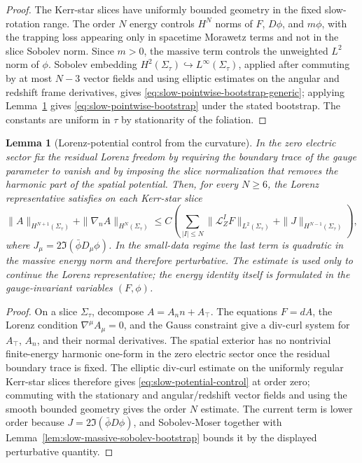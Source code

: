 \documentclass[11pt]{article}
\numberwithin{equation}{section}
\theoremstyle{plain}
\newtheorem{lemma}[theorem]{Lemma}
\theoremstyle{definition}
\theoremstyle{remark}
\begin{document}
\begin{proof}
The Kerr-star slices have uniformly bounded geometry in the fixed slow-rotation range.  The order \(N\) energy controls \(H^N\) norms of \(F\), \(D\phi\), and \(m\phi\), with the trapping loss appearing only in spacetime Morawetz terms and not in the slice Sobolev norm.  Since \(m>0\), the massive term controls the unweighted \(L^2\) norm of \(\phi\).  Sobolev embedding \(H^2(\Sigma_\tau)\hookrightarrow L^\infty(\Sigma_\tau)\), applied after commuting by at most \(N-3\) vector fields and using elliptic estimates on the angular and redshift frame derivatives, gives \eqref{eq:slow-pointwise-bootstrap-generic}; applying Lemma~\ref{lem:slow-lorenz-potential-control} gives \eqref{eq:slow-pointwise-bootstrap} under the stated bootstrap.  The constants are uniform in \(\tau\) by stationarity of the foliation.
\end{proof}

\begin{lemma}[Lorenz-potential control from the curvature]\label{lem:slow-lorenz-potential-control}
In the zero electric sector fix the residual Lorenz freedom by requiring the boundary trace of the gauge parameter to vanish and by imposing the slice normalization that removes the harmonic part of the spatial potential.  Then, for every \(N\ge6\), the Lorenz representative satisfies on each Kerr-star slice
\begin{equation}\label{eq:slow-potential-control}
 \|A\|_{H^{N+1}(\Sigma_\tau)}+
 \|\nabla_nA\|_{H^{N}(\Sigma_\tau)}
 \le C\left(
 \sum_{|I|\le N}\|\mathcal L_Z^IF\|_{L^2(\Sigma_\tau)}
 +\|J\|_{H^{N-1}(\Sigma_\tau)}
 \right),
\end{equation}
where \(J_\mu=2\Im(\bar\phi D_\mu\phi)\).  In the small-data regime the last term is quadratic in the massive energy norm and therefore perturbative.  The estimate is used only to continue the Lorenz representative; the energy identity itself is formulated in the gauge-invariant variables \((F,\phi)\).
\end{lemma}

\begin{proof}
On a slice \(\Sigma_\tau\), decompose \(A=A_n n+A_\top\).  The equations \(F=dA\), the Lorenz condition \(\nabla^\mu A_\mu=0\), and the Gauss constraint give a div-curl system for \(A_\top\), \(A_n\), and their normal derivatives.  The spatial exterior has no nontrivial finite-energy harmonic one-form in the zero electric sector once the residual boundary trace is fixed.  The elliptic div-curl estimate on the uniformly regular Kerr-star slices therefore gives \eqref{eq:slow-potential-control} at order zero; commuting with the stationary and angular/redshift vector fields and using the smooth bounded geometry gives the order \(N\) estimate.  The current term is lower order because \(J=2\Im(\bar\phi D\phi)\), and Sobolev-Moser together with Lemma~\ref{lem:slow-massive-sobolev-bootstrap} bounds it by the displayed perturbative quantity.
\end{proof}
\end{document}
